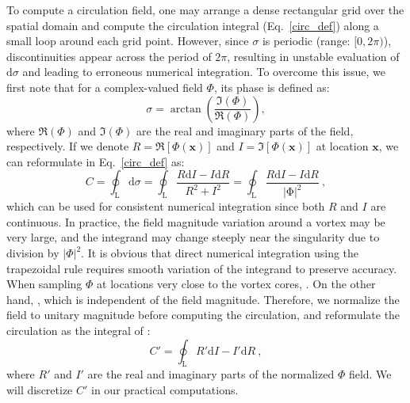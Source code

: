 \documentclass[10pt,journal,compsoc,twoside]{IEEEtran}
\newcommand{\rd}[1]{{\color[rgb]{0.0,0.0,0.0}{#1}}}
\begin{document}
	To compute a circulation field, one may arrange a dense rectangular grid over the spatial domain and compute the circulation integral (Eq.~\ref{circ_def}) along a small loop around each grid point.
	However, since $\sigma$ is periodic (range: $[0,2\pi)$), discontinuities appear across the period of $2\pi$, resulting in unstable evaluation of $\mathrm{d} \sigma$ and leading to erroneous numerical integration.
	To overcome this issue, we first note that for a complex-valued field $\Phi$, its phase is defined as:
	\begin{equation}
		\sigma = \arctan \left( \frac{\Im(\Phi)}{\Re(\Phi)} \right),
	\end{equation}
	\noindent
	where $\Re(\Phi)$ and $\Im(\Phi)$ are the real and imaginary parts of the field, respectively.
	If we denote $\mathit{R}=\Re\left[\Phi(\mathbf{x})\right]$ and $\mathit{I}=\Im\left[\Phi(\mathbf{x})\right]$ at location $\mathbf{x}$, we can reformulate \rd{$C$} in Eq.~\ref{circ_def} as:
	\begin{equation} \label{sigma_transform}
		C=\oint_\mathrm{L} \mathrm{d} \sigma = \oint_\mathrm{L} \mathrm{\frac{\mathit{R} d \mathit{I} - \mathit{I} d \mathit{R}}{\mathit{R}^2+\mathit{I}^2}} = \oint_\mathrm{L} \mathrm{\frac{\mathit{R} d \mathit{I} - \mathit{I} d \mathit{R}}{|\Phi|^2}} \ ,
	\end{equation}
	which can be used for consistent numerical integration since both $\mathit{R}$ and $\mathit{I}$ are continuous.
	In practice, the field magnitude variation around a vortex may be very large, and the integrand may change steeply near the singularity due to division by $|\Phi|^2$.
	It is obvious that direct numerical integration using the trapezoidal rule requires smooth variation of the integrand to preserve accuracy. 
	When sampling $\Phi$ at locations very close to the vortex cores, \rd{the integral becomes inaccurate due to large variations}. 
	On the other hand, \rd{the circulation is used only to indicate singularity}, which is independent of the field magnitude.
	Therefore, we normalize the field \rd{$\Phi$} to unitary magnitude before computing the circulation, and reformulate the circulation as the integral of \rd{the gradient of the normalized phase field}:
	\begin{equation}
		C'=\oint_\mathrm{L} \mathrm{\mathit{R}' d \mathit{I} - \mathit{I}' d \mathit{R}} \ ,
	\end{equation}
	where $\mathit{R}'$ and $\mathit{I}'$ are the real and imaginary parts of the normalized $\Phi$ field.
	We will discretize $C'$ in our practical computations.
	
\end{document}
